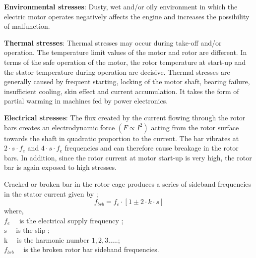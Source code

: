 \textbf{Environmental stresses}: Dusty, wet and/or oily environment in which the electric motor operates negatively affects the engine and increases the possibility of malfunction.

\textbf{Thermal stresses}: Thermal stresses may occur during take-off and/or operation. The temperature limit values of the motor and rotor are different. In terms of the safe operation of the motor, the rotor temperature at start-up and the stator temperature during operation are decisive. Thermal stresses are generally caused by frequent starting, locking of the motor shaft, bearing failure, insufficient cooling, skin effect and current accumulation. It takes the form of partial warming in machines fed by power electronics.

\textbf{Electrical stresses}: The flux created by the current flowing through the rotor bars creates an electrodynamic force $(F \propto I^2)$ acting from the rotor surface towards the shaft in quadratic proportion to the current. The bar vibrates at $2\cdot s\cdot f_{e}$ and $4\cdot s\cdot f_{e}$  frequencies and can therefore cause breakage in the rotor bars. In addition, since the rotor current at motor start-up is very high, the rotor bar is again exposed to high stresses.

Cracked or broken bar in the rotor cage produces a series of sideband frequencies in the stator current given by \cite{karmakar2016induction};
\begin{equation}
	f_{brb}=f_{e} \cdot\left[1 \pm 2\cdot k\cdot s \right]
	\label{rotorfault}
\end{equation}
where,\\
$f_{e} \quad$ is the electrical supply frequency ;\\
$\mathrm{s} \quad$ is the slip ;\\
$\mathrm{k} \quad$ is the harmonic number $1,2,3 \ldots$..;\\
$f_{brb} \quad$ is the broken rotor bar sideband frequencies.


